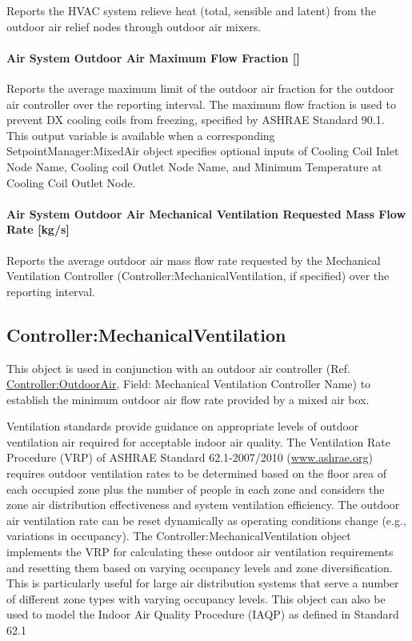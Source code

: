 Reports the HVAC system relieve heat (total, sensible and latent) from the outdoor air relief nodes through outdoor air mixers.

\paragraph{Air System Outdoor Air Maximum Flow Fraction {[]}}\label{air-system-outdoor-air-maximum-flow-fraction}

Reports the average maximum limit of the outdoor air fraction for the outdoor air controller over the reporting interval. The maximum flow fraction is used to prevent DX cooling coils from freezing, specified by ASHRAE Standard 90.1. This output variable is available when a corresponding SetpointManager:MixedAir object specifies optional inputs of Cooling Coil Inlet Node Name, Cooling coil Outlet Node Name, and Minimum Temperature at Cooling Coil Outlet Node.

\paragraph{Air System Outdoor Air Mechanical Ventilation Requested Mass Flow Rate {[}kg/s{]}}\label{air-system-mechvent-air-mass-flow-rate-kgs}

Reports the average outdoor air mass flow rate requested by the Mechanical Ventilation Controller (Controller:MechanicalVentilation, if specified) over the reporting interval.

\subsection{Controller:MechanicalVentilation}\label{controllermechanicalventilation}

This object is used in conjunction with an outdoor air controller (Ref. \hyperref[controlleroutdoorair]{Controller:OutdoorAir}, Field: Mechanical Ventilation Controller Name) to establish the minimum outdoor air flow rate provided by a mixed air box.

Ventilation standards provide guidance on appropriate levels of outdoor ventilation air required for acceptable indoor air quality. The Ventilation Rate Procedure (VRP) of ASHRAE Standard 62.1-2007/2010 (\href{http://www.ashrae.org}{www.ashrae.org}) requires outdoor ventilation rates to be determined based on the floor area of each occupied zone plus the number of people in each zone and considers the zone air distribution effectiveness and system ventilation efficiency. The outdoor air ventilation rate can be reset dynamically as operating conditions change (e.g., variations in occupancy). The Controller:MechanicalVentilation object implements the VRP for calculating these outdoor air ventilation requirements and resetting them based on varying occupancy levels and zone diversification. This is particularly useful for large air distribution systems that serve a number of different zone types with varying occupancy levels. This object can also be used to model the Indoor Air Quality Procedure (IAQP) as defined in Standard 62.1


